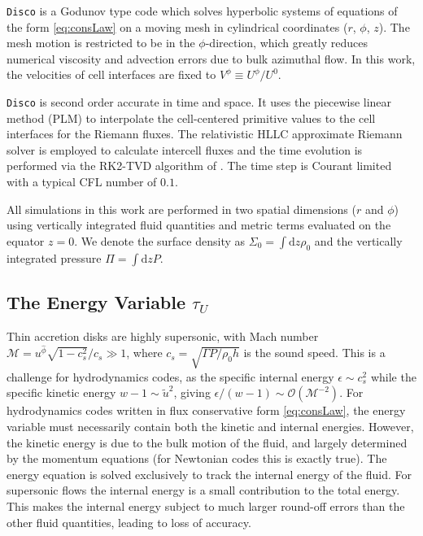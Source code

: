 \documentclass{emulateapj}
\newcommand{\eps}{\epsilon}
\newcommand{\Sig}{\Sigma}
\newcommand{\Mach}{\mathcal{M}}
\newcommand{\dd}{\mbox{d}}
\newcommand{\Disco}{{\texttt{Disco}}}
\newcommand{\OO}{\mathcal{O}}
\begin{document}
\Disco{} is a Godunov type code which solves hyperbolic systems of equations of the form \eqref{eq:consLaw} on a moving mesh in cylindrical coordinates ($r$, $\phi$, $z$).  The mesh motion is restricted to be in the $\phi$-direction, which greatly reduces numerical viscosity and advection errors due to bulk azimuthal flow.  In this work, the velocities of cell interfaces are fixed to $V^\phi \equiv U^\phi/U^0$.   

\Disco{} is second order accurate in time and space.  It uses the piecewise linear method (PLM) to interpolate the cell-centered primitive values to the cell interfaces for the Riemann fluxes.  The relativistic HLLC approximate Riemann solver \citep{Mignone05} is employed to calculate intercell fluxes and the time evolution is performed via the RK2-TVD algorithm of \cite{Gottlieb98}.  The time step is Courant limited with a typical CFL number of $0.1$.

All simulations in this work are performed in two spatial dimensions ($r$ and $\phi$) using vertically integrated fluid quantities and metric terms evaluated on the equator $z=0$.  We denote the surface density as $\Sig_0 = \int \dd z \rho_0$ and the vertically integrated pressure $\Pi = \int \dd z P$.  


\subsection{The Energy Variable $\tau_U$}
\label{subsec:energy}


Thin accretion disks are highly supersonic, with Mach number $\Mach = u^{\hat{\phi}} \sqrt{1-c_s^2}/c_s \gg 1$, where $c_s = \sqrt{\Gamma P / \rho_0 h}$ is the sound speed.  This is a challenge for hydrodynamics codes, as the specific internal energy $\eps \sim c_s^2$ while the specific kinetic energy $w-1 \sim \tilde{u}^2$, giving $\eps / (w-1) \sim \OO(\Mach^{-2})$.  For hydrodynamics codes written in flux conservative form \eqref{eq:consLaw}, the energy variable must necessarily contain both the kinetic and internal energies.  However, the kinetic energy is due to the bulk motion of the fluid, and largely determined by the momentum equations (for Newtonian codes this is exactly true).  The energy equation is solved exclusively to track the internal energy of the fluid. For supersonic flows the internal energy is a small contribution to the total energy.  This makes the internal energy subject to much larger round-off errors than the other fluid quantities, leading to loss of accuracy.
\end{document}
